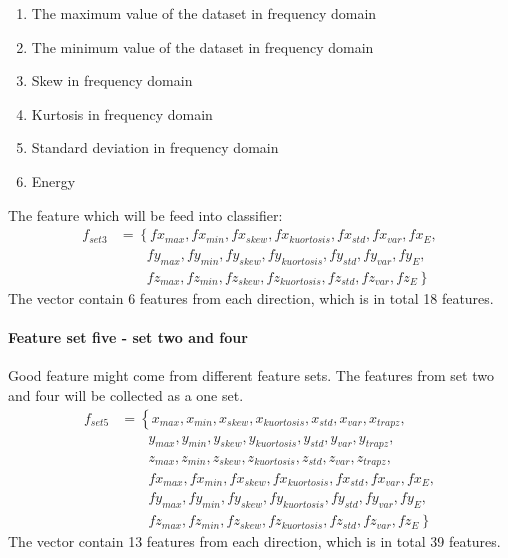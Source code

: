 \documentclass[USenglish]{ifimaster}  %
\begin{document}
	\begin{enumerate}
		\item The maximum value of the dataset in frequency domain
		\item The minimum value of the dataset in frequency domain
		\item Skew in frequency domain
		\item Kurtosis in frequency domain 
		\item Standard deviation in frequency domain
		\item Energy 
	\end{enumerate}
	The feature which will be feed into classifier:
	\begin{align}
	f_{set3} &= \left\{ fx_{max},fx_{min},fx_{skew},fx_{kuortosis},fx_{std},fx_{var},fx_{E}, \right.\nonumber\\
	&\qquad \left. {} fy_{max},fy_{min},fy_{skew},fy_{kuortosis},fy_{std},fy_{var},fy_{E}, \right.\nonumber\\
	&\qquad \left. {} fz_{max},fz_{min},fz_{skew},fz_{kuortosis},fz_{std},fz_{var},fz_{E} \right\}
	\end{align}
	The vector contain 6 features from each direction, which is in total 18 features. 
	
	\paragraph{Feature set five - set two and four} Good feature might come from different feature sets. The features from set two and four will be collected as a one set. 
	\begin{align}
	f_{set5} &= \left\{ x_{max},x_{min},x_{skew},x_{kuortosis},x_{std},x_{var},x_{trapz}, \right.\nonumber\\
	&\qquad \left. {}  y_{max},y_{min},y_{skew},y_{kuortosis},y_{std},y_{var},y_{trapz}, \right.\nonumber\\
	&\qquad \left. {}  z_{max},z_{min},z_{skew},z_{kuortosis},z_{std},z_{var},z_{trapz}, \right.\nonumber\\
	&\qquad \left. {} fx_{max},fx_{min},fx_{skew},fx_{kuortosis},fx_{std},fx_{var},fx_{E}, \right.\nonumber\\
	&\qquad \left. {} fy_{max},fy_{min},fy_{skew},fy_{kuortosis},fy_{std},fy_{var},fy_{E}, \right.\nonumber\\
	&\qquad \left. {} fz_{max},fz_{min},fz_{skew},fz_{kuortosis},fz_{std},fz_{var},fz_{E} \right\}
	\end{align}
	The vector contain 13 features from each direction, which is in total 39 features. 
	
\end{document}
